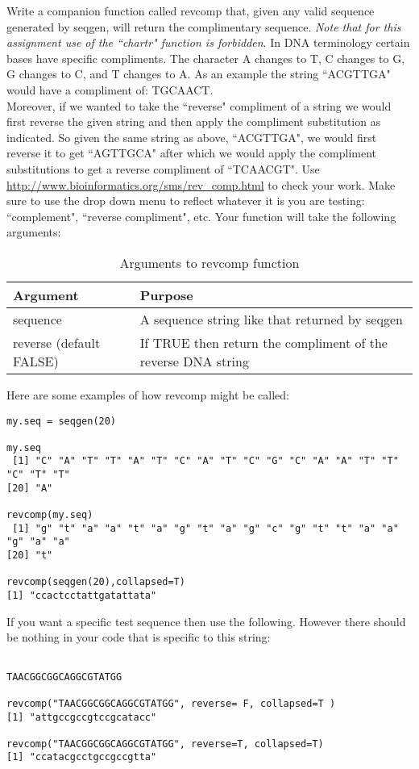 \documentclass{article}
\begin{document}
Write a companion function called revcomp that, given any valid sequence generated by seqgen, will return the complimentary sequence. \emph{Note that for this assignment use of the ``chartr" function is forbidden}. In DNA terminology certain bases have specific compliments. The character A changes to T, C changes to G, G changes to C, and T changes to A. As an example the string ``ACGTTGA" would have a compliment of: TGCAACT. 
\\

Moreover, if we wanted to take the ``reverse" compliment of a string we would first reverse the given string and then apply the compliment substitution as indicated. So given the same string as above, ``ACGTTGA", we would first reverse it to get ``AGTTGCA" after which we would apply the compliment substitutions to get a reverse compliment of ``TCAACGT". Use \url{http://www.bioinformatics.org/sms/rev_comp.html} to check your work. Make sure to use the drop down menu to reflect whatever it is you are testing: ``complement", ``reverse compliment", etc. Your function will take the following arguments:

\begin{table}[ht]
\caption{Arguments to revcomp function}
\begin{tabular}{l | l}
\hline\hline
Argument & Purpose \\ [1ex]
\hline
sequence & A sequence string like that returned by seqgen \\ [1ex]
\hline 
reverse (default FALSE) & If TRUE then return the compliment of the reverse DNA string \\ 
\hline
\end{tabular}
\label{table:nonlin}
\end{table}

\noindent
Here are some examples of how revcomp might be called:
\begin{verbatim}
my.seq = seqgen(20)

my.seq
 [1] "C" "A" "T" "T" "A" "T" "C" "A" "T" "C" "G" "C" "A" "A" "T" "T" "C" "T" "T"
[20] "A"

revcomp(my.seq)
 [1] "g" "t" "a" "a" "t" "a" "g" "t" "a" "g" "c" "g" "t" "t" "a" "a" "g" "a" "a"
[20] "t"

revcomp(seqgen(20),collapsed=T)
[1] "ccactcctattgatattata"
\end{verbatim}
\noindent
If you want a specific test sequence then use the following. However there should be nothing in your code that is specific to this string:
\begin{verbatim}

TAACGGCGGCAGGCGTATGG

revcomp("TAACGGCGGCAGGCGTATGG", reverse= F, collapsed=T )
[1] "attgccgccgtccgcatacc"

revcomp("TAACGGCGGCAGGCGTATGG", reverse=T, collapsed=T)
[1] "ccatacgcctgccgccgtta"

\end{verbatim}
\end{document}
